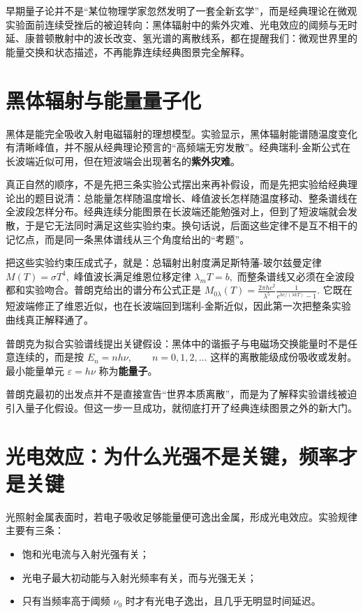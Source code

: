 \documentclass[lang=cn,11pt]{elegantbook}
\newcommand{\bridge}[1]{\begin{note}#1\end{note}}
\begin{document}
\bridge{早期量子论并不是“某位物理学家忽然发明了一套全新玄学”，而是经典理论在微观实验面前连续受挫后的被迫转向：黑体辐射中的紫外灾难、光电效应的阈频与无时延、康普顿散射中的波长改变、氢光谱的离散线系，都在提醒我们：微观世界里的能量交换和状态描述，不再能靠连续经典图景完全解释。}

\section{黑体辐射与能量量子化}

黑体是能完全吸收入射电磁辐射的理想模型。实验显示，黑体辐射能谱随温度变化有清晰峰值，并不服从经典理论预言的“高频端无穷发散”。经典瑞利-金斯公式在长波端近似可用，但在短波端会出现著名的\textbf{紫外灾难}。

真正自然的顺序，不是先把三条实验公式摆出来再补假设，而是先把实验给经典理论出的题目说清：总能量怎样随温度增长、峰值波长怎样随温度移动、整条谱线在全波段怎样分布。经典连续分能图景在长波端还能勉强对上，但到了短波端就会发散，于是它无法同时满足这些实验约束。换句话说，后面这些定律不是互不相干的记忆点，而是同一条黑体谱线从三个角度给出的“考题”。

把这些实验约束压成式子，就是：总辐射出射度满足斯特藩-玻尔兹曼定律
 \(M(T)=\sigma T^4,\) 
峰值波长满足维恩位移定律
 \(\lambda_m T=b,\) 
而整条谱线又必须在全波段都和实验吻合。普朗克给出的谱分布公式正是
 \(M_{0\lambda}(T)=\frac{2\pi hc^2}{\lambda^5}\frac{1}{e^{hc/(\lambda kT)}-1}.\) 
它既在短波端修正了维恩近似，也在长波端回到瑞利-金斯近似，因此第一次把整条实验曲线真正解释通了。

普朗克为拟合实验谱线提出关键假设：黑体中的谐振子与电磁场交换能量时不是任意连续的，而是按
 \(E_n=nh\nu,\qquad n=0,1,2,\dots\) 
这样的离散能级成份吸收或发射。最小能量单元
 \(\varepsilon=h\nu\) 
称为\textbf{能量子}。

\begin{remark}
普朗克最初的出发点并不是直接宣告“世界本质离散”，而是为了解释实验谱线被迫引入量子化假设。但这一步一旦成功，就彻底打开了经典连续图景之外的新大门。
\end{remark}

\section{光电效应：为什么光强不是关键，频率才是关键}

光照射金属表面时，若电子吸收足够能量便可逸出金属，形成光电效应。实验规律主要有三条：
\begin{itemize}
 \item 饱和光电流与入射光强有关；
 \item 光电子最大初动能与入射光频率有关，而与光强无关；
 \item 只有当频率高于阈频 \(\nu_0\) 时才有光电子逸出，且几乎无明显时间延迟。
\end{itemize}
\end{document}
